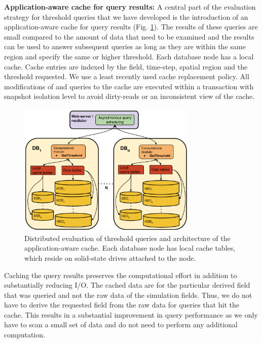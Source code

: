 \documentclass{sig-alternate}
\begin{document}
{\bf Application-aware cache for query results:} A central part of the evaluation strategy for threshold queries that we have developed is the 
introduction of an application-aware cache
for query results (Fig. \ref{fig:cache_diagram}). The results of these queries are small compared to the amount of data that need to be examined and the
results can be used to answer subsequent queries as long as they are within the same region and specify the same or higher threshold. Each database node 
has a local cache. Cache entries are indexed by the field, time-step, spatial region and the threshold requested. We use a least recently
used cache replacement policy. All modifications of and queries to the cache are executed within a transaction with snapshot isolation level to
avoid dirty-reads or an inconsistent view of the cache. 

\begin{figure}
\centering
\includegraphics[width=3.35in]{Figures/cache_diagram.pdf}
\caption{Distributed evaluation of threshold queries and architecture of the application-aware cache. 
Each database node has local cache tables, which reside on solid-state drives attached to the node.}
\label{fig:cache_diagram}
\end{figure}

Caching the query results
preserves the computational effort in addition to substantially reducing I/O. The cached data are for the particular derived field that was queried
and not the raw data of the simulation fields.
Thus, we do not have to derive the requested field from the raw data for 
queries that hit the cache. This results in a substantial improvement in query performance as we only have to scan
a small set of data and do not need to perform any additional computation.
\end{document}
